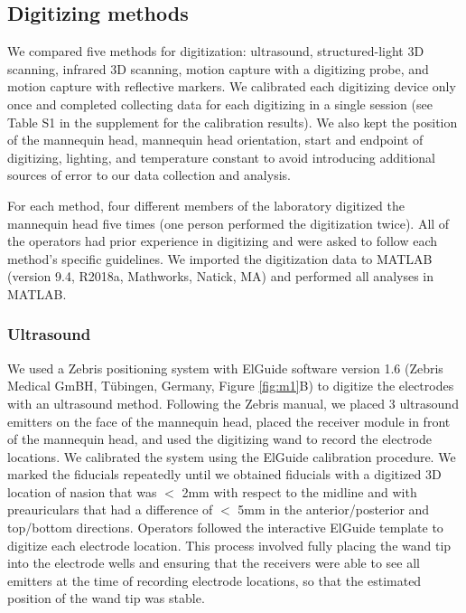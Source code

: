 \documentclass{UCF_ETD}
\renewcommand{\ul}{}
\begin{document}
\subsection{Digitizing methods}
We compared five methods for digitization: ultrasound, structured-light 3D scanning, infrared 3D scanning, motion capture with a digitizing probe, and motion capture with reflective markers. \ul{We calibrated each digitizing device only once and completed collecting data for each digitizing in a single session (see Table S1 in the supplement for the calibration results). We also kept the position of the mannequin head, mannequin head orientation, start and endpoint of digitizing, lighting, and temperature constant to avoid introducing additional sources of error to our data collection and analysis.}

For each method, \ul{four different} members of the laboratory digitized the mannequin head five times \ul{(one person performed the digitization twice)}. All of the operators had prior experience in digitizing and were asked to follow each method's specific guidelines. We imported the digitization data to MATLAB (version 9.4, R2018a, Mathworks, Natick, MA) and performed all analyses in MATLAB.

\subsubsection{Ultrasound}
We used a Zebris positioning system with ElGuide software version 1.6 (Zebris Medical GmBH, T\"ubingen, Germany, Figure \ref{fig:m1}B) to digitize the electrodes with an ultrasound method. Following the Zebris manual, we placed 3 ultrasound emitters on the face of the mannequin head, placed the receiver module in front of the mannequin head, and used the digitizing wand to record the electrode locations. We calibrated the system using the ElGuide calibration procedure. We marked the fiducials repeatedly until we obtained fiducials with a digitized 3D location of nasion that was $<$ 2mm with respect to the midline and with preauriculars that had a difference of $<$ 5mm in the anterior/posterior and top/bottom directions. Operators followed the interactive ElGuide template to digitize each electrode location. This process involved fully placing the wand tip into the electrode wells and ensuring that the receivers were able to see all emitters at the time of recording electrode locations, so that the estimated position of the wand tip was stable. 
\end{document}
